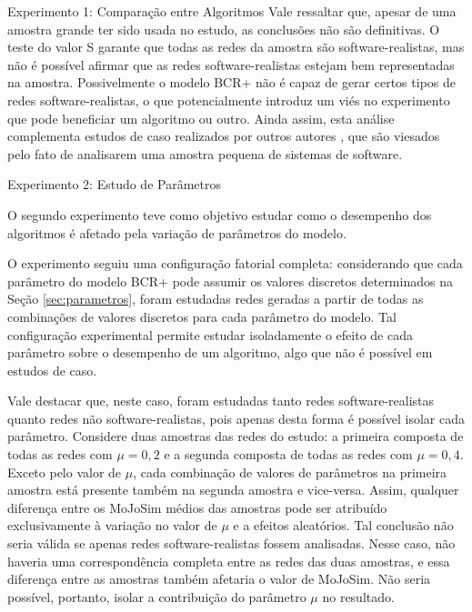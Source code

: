 \begin{section}{Experimento 1: Comparação entre Algoritmos}
Vale ressaltar que, apesar de uma amostra grande ter sido usada no estudo, as conclusões não são definitivas. O teste do valor S garante que todas as redes da amostra são software-realistas, mas não é possível afirmar que as redes software-realistas estejam bem representadas na amostra. Possivelmente o modelo BCR+ não é capaz de gerar certos tipos de redes software-realistas, o que potencialmente introduz um viés no experimento que pode beneficiar um algoritmo ou outro. Ainda assim, esta análise complementa estudos de caso realizados por outros autores \cite{Wu2005,Andritsos2005}, que são viesados pelo fato de analisarem uma amostra pequena de sistemas de software.

\end{section}

\begin{section}{Experimento 2: Estudo de Parâmetros}

O segundo experimento teve como objetivo estudar como o desempenho dos algoritmos é afetado pela variação de parâmetros do modelo. 

O experimento seguiu uma configuração fatorial completa: considerando que cada parâmetro do modelo BCR+ pode assumir os valores discretos determinados na Seção \ref{sec:parametros}, foram estudadas redes geradas a partir de todas as combinações de valores discretos para cada parâmetro do modelo. Tal configuração experimental permite estudar isoladamente o efeito de cada parâmetro sobre o desempenho de um algoritmo, algo que não é possível em estudos de caso.

Vale destacar que, neste caso, foram estudadas tanto redes software-realistas quanto redes não software-realistas, pois apenas desta forma é possível isolar cada parâmetro. Considere duas amostras das redes do estudo: a primeira composta de todas as redes com $\mu = 0,2$ e a segunda composta de todas as redes com $\mu = 0,4$. Exceto pelo valor de $\mu$, cada combinação de valores de parâmetros na primeira amostra está presente também na segunda amostra e vice-versa. Assim, qualquer diferença entre os MoJoSim médios das amostras pode ser atribuído exclusivamente à variação no valor de $\mu$ e a efeitos aleatórios. Tal conclusão não seria válida se apenas redes software-realistas fossem analisadas. Nesse caso, não haveria uma correspondência completa entre as redes das duas amostras, e essa diferença entre as amostras também afetaria o valor de MoJoSim. Não seria possível, portanto, isolar a contribuição do parâmetro $\mu$ no resultado.


\end{section}

